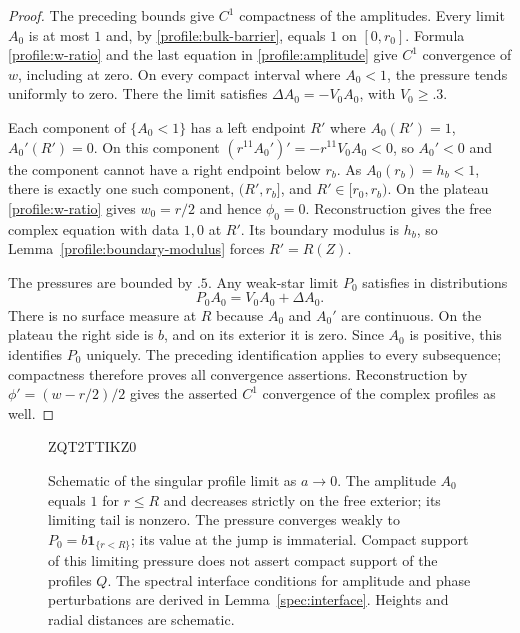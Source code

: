 \documentclass[11pt]{article}
\numberwithin{equation}{section}
\theoremstyle{definition}
\theoremstyle{remark}
\begin{document}
\begin{proof}
The preceding bounds give $C^1$ compactness of the amplitudes.  Every
limit $A_0$ is at most $1$ and, by \eqref{profile:bulk-barrier}, equals
$1$ on $[0,r_0]$.  Formula \eqref{profile:w-ratio} and the last equation
in \eqref{profile:amplitude} give $C^1$ convergence of $w$, including at
zero.  On every compact interval where $A_0<1$, the pressure tends
uniformly to zero.  There the limit satisfies $\Delta A_0=-V_0A_0$,
with $V_0\ge.3$.

Each component of $\{A_0<1\}$ has a left endpoint $R'$ where
$A_0(R')=1$, $A_0'(R')=0$.  On this component
$(r^{11}A_0')'=-r^{11}V_0A_0<0$, so $A_0'<0$ and the component cannot
have a right endpoint below $r_b$.  As $A_0(r_b)=h_b<1$, there is exactly
one such component, $(R',r_b]$, and $R'\in[r_0,r_b)$.  On the plateau
\eqref{profile:w-ratio} gives $w_0=r/2$ and hence $\phi_0=0$.
Reconstruction gives the free complex equation with data $1,0$ at $R'$.
Its boundary modulus is $h_b$, so
Lemma~\ref{profile:boundary-modulus} forces $R'=R(Z)$.

The pressures are bounded by $.5$.  Any weak-star limit $P_0$ satisfies
in distributions
\[
 P_0A_0=V_0A_0+\Delta A_0.
\]
There is no surface measure at $R$ because $A_0$ and $A_0'$ are
continuous.  On the plateau the right side is $b$, and on its exterior
it is zero.  Since $A_0$ is positive, this identifies $P_0$ uniquely.
The preceding identification applies to every subsequence; compactness
therefore proves all convergence assertions.  Reconstruction by
$\phi'=(w-r/2)/2$ gives the asserted $C^1$ convergence of the complex
profiles as well.
\end{proof}

\begin{figure}[tbp]
  
  \begingroup
  
  ZQT2TTIKZ0
  \endgroup
  \caption{Schematic of the singular profile limit as $a\to0$.
  The amplitude $A_0$ equals $1$ for $r\le R$ and decreases strictly
  on the free exterior; its limiting tail is nonzero. The pressure
  converges weakly to $P_0=b\mathbf 1_{\{r<R\}}$; its value at the
  jump is immaterial. Compact support of this limiting pressure does
  not assert compact support of the profiles $Q$.
  The spectral interface conditions for amplitude and phase perturbations
  are derived in Lemma~\ref{spec:interface}.
  Heights and radial distances are schematic.}
  \label{fig:core-limit}
\end{figure}
\end{document}
